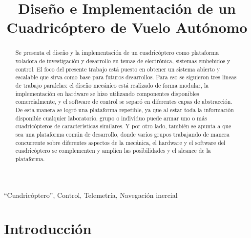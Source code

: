 \documentclass[a4paper, conference]{IEEEtran}
\begin{document}
%
\title{Diseño e Implementación de un Cuadricóptero de Vuelo Autónomo}


\author{
}



\maketitle


\begin{abstract}
Se presenta el diseño y la implementación de un cuadricóptero como plataforma voladora de investigación y desarrollo en temas de electrónica, sistemas embebidos y control. El foco del presente trabajo está puesto en obtener un sistema abierto y escalable que sirva como base para futuros desarrollos.
Para eso se siguieron tres líneas de trabajo paralelas: el diseño mecánico está realizado de forma modular, la implementación en hardware se hizo utilizando componentes disponibles comercialmente, y el software de control se separó en diferentes capas de abstracción.
De esta manera se logró una plataforma repetible, ya que al estar toda la información disponible cualquier laboratorio, grupo o individuo puede armar uno o más cuadricópteros de características similares. Y por otro lado, también se apunta a que sea una plataforma común de desarrollo, donde varios grupos trabajando de manera concurrente sobre diferentes aspectos de la mecánica, el hardware y el software del cuadricóptero se complementen y amplíen las posibilidades y el alcance de la plataforma.
\end{abstract}


\begin{IEEEkeywords}
``Cuadricóptero'', Control, Telemetría, Navegación inercial
\end{IEEEkeywords}


\IEEEpeerreviewmaketitle



\section{Introducción}
\end{document}
